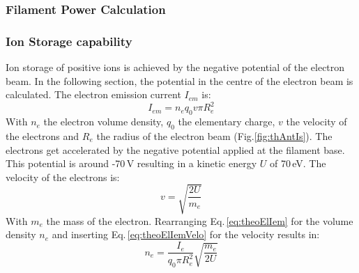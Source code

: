 		\subsubsection{Filament Power Calculation}
		
		\subsubsection{Ion Storage capability}
		Ion storage of positive ions is achieved by the negative potential of the electron beam. In the following section, the potential in the centre of the electron beam is calculated. The electron emission current $I_{em}$ is:
		\begin{equation}
			I_{em} = n_e q_0 v\pi R_e^2
			\label{eq:theoElIem}
		\end{equation}
		With $n_e$ the electron volume density, $q_0$ the elementary charge, $v$ the velocity of the electrons and $R_e$ the radius of the electron beam (Fig.\ref{fig:thAntIs}). The electrons get accelerated by the negative potential applied at the filament base. This potential is around -70\,\si{\volt} resulting in a kinetic energy $U$ of 70\,\si{\electronvolt}. The velocity of the electrons is:
		\begin{equation}
			v = \sqrt{\frac{2 U}{m_e}}
			\label{eq:theoElIemVelo}
		\end{equation}
		With $m_e$ the mass of the electron. Rearranging Eq.\,\eqref{eq:theoElIem} for the volume density $n_e$ and inserting Eq.\,\eqref{eq:theoElIemVelo} for the velocity results in:
		\begin{equation}
			n_e = \frac{I_e}{q_0 \pi R_e^2}\sqrt{\frac{m_e}{2U}}						\label{eq:theoElIemNe}
		\end{equation}
